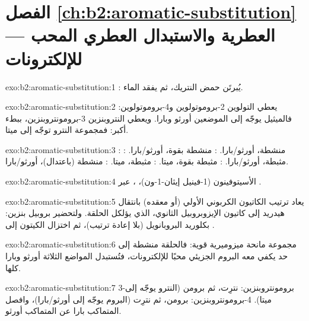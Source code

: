 \section*{الفصل \ref{ch:b2:aromatic-substitution} --- العطرية والاستبدال العطري المحب للإلكترونات}

\begin{solution}{exo:b2:aromatic-substitution:1}
: يُبرتَن حمض النتريك، ثم يفقد الماء.
\end{solution}

\begin{solution}{exo:b2:aromatic-substitution:2}
يعطي التولوين 2-بروموتولوين و4-بروموتولوين: فالميثيل يوجّه إلى الموضعين أورثو 
وبارا. ويعطي النتروبنزين 3-برومونتروبنزين، ببطء أكبر: فمجموعة النترو
توجّه إلى ميتا.
\end{solution}

\begin{solution}{exo:b2:aromatic-substitution:3}
: منشطة، أورثو/بارا. : منشطة بقوة، أورثو/بارا. : مثبطة، أورثو/بارا.
: مثبطة بقوة، ميتا. : مثبطة، ميتا. :
منشطة (باعتدال)، أورثو/بارا.
\end{solution}

\begin{solution}{exo:b2:aromatic-substitution:4}
الأسيتوفينون (1-فينيل إيثان-1-ون)، ، عبر  .
\end{solution}

\begin{solution}{exo:b2:aromatic-substitution:5}
يعاد ترتيب الكاتيون الكربوني الأولي (أو معقده) بانتقال هيدريد إلى كاتيون
الإيزوبروبيل الثانوي، الذي يؤلكل الحلقة. ولتحضير بروبيل بنزين:  بكلوريد
البروبانويل (بلا إعادة ترتيب)، ثم اختزال  الكيتون إلى .
\end{solution}

\begin{solution}{exo:b2:aromatic-substitution:6}
مجموعة  مانحة ميزوميرية قوية: فالحلقة منشطة إلى حد يكفي معه البروم الجزيئي
محبًا للإلكترونات، فتُستبدل المواضع الثلاثة أورثو وبارا كلها.
\end{solution}

\begin{solution}{exo:b2:aromatic-substitution:7}
3-برومونتروبنزين: نترِت، ثم برومن (النترو يوجّه إلى ميتا). 4-برومونتروبنزين:
برومن، ثم نترِت (البروم يوجّه إلى أورثو/بارا)، وافصل المتماكب بارا عن
المتماكب أورثو.
\end{solution}

